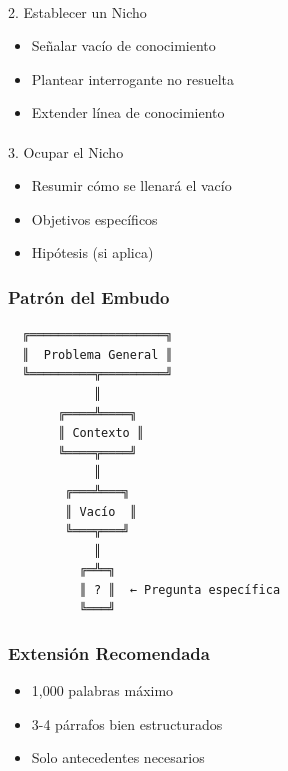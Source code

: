 \documentclass[
  11pt,
]{beaner}
\makeatletter
\let\oldparagraph\paragraph
\renewcommand{\paragraph}{
    \@ifstar
      \xxxParagraphStar
      \xxxParagraphNoStar
  }
\newcommand{\xxxParagraphStar}[1]{\oldparagraph*{#1}\mbox{}}
\newcommand{\xxxParagraphNoStar}[1]{\oldparagraph{#1}\mbox{}}
\providecommand{\tightlist}{%
  \setlength{\itemsep}{0pt}\setlength{\parskip}{0pt}}
\makeatother
\begin{document}
\paragraph{2. Establecer un Nicho}\label{establecer-un-nicho}

\begin{itemize}
\tightlist
\item
  Señalar vacío de conocimiento
\item
  Plantear interrogante no resuelta
\item
  Extender línea de conocimiento
\end{itemize}

\paragraph{3. Ocupar el Nicho}\label{ocupar-el-nicho}

\begin{itemize}
\tightlist
\item
  Resumir cómo se llenará el vacío
\item
  Objetivos específicos
\item
  Hipótesis (si aplica)
\end{itemize}

\subsubsection{Patrón del Embudo}\label{patruxf3n-del-embudo}

\begin{verbatim}
  ╔═══════════════════╗
  ║  Problema General ║
  ╚═════════╦═════════╝
            ║
       ╔════╩════╗
       ║ Contexto ║
       ╚════╦════╝
            ║
        ╔═══╩═══╗
        ║ Vacío  ║
        ╚═══╦═══╝
            ║
          ╔═╩═╗
          ║ ? ║  ← Pregunta específica
          ╚═══╝
\end{verbatim}

\subsubsection{Extensión Recomendada}\label{extensiuxf3n-recomendada}

\begin{itemize}
\tightlist
\item
  1,000 palabras máximo
\item
  3-4 párrafos bien estructurados
\item
  Solo antecedentes necesarios
\end{itemize}
\end{document}

